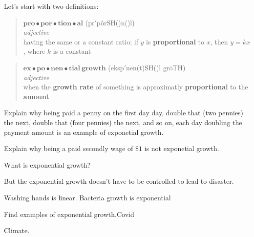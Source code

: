 \documentclass[nooutcomes,noauthor,hints]{ximera}
\begin{document}
\mynewpage



\begin{question}
  Let's start with two definitions:
  \begin{mdframed}[style=OutcomeStyle]
\begin{quote}
  $\textbf{pro}\bullet\textbf{por}\bullet\textbf{tion}\bullet\textbf{al}$
  (pr{}$'$p\^orSH({})n({})l)
  \\
  
  \textit{adjective}\\

  
\quad having the same or a constant ratio; if $y$ is \textbf{proportional} to
$x$, then $y = k x$, where $k$ is a constant
\end{quote}
  \end{mdframed}

  
  \begin{mdframed}[style=OutcomeStyle]
\begin{quote}
  $\textbf{ex}\bullet\textbf{po}\bullet\textbf{nen}\bullet\textbf{tial}~\textbf{growth}$
  ({}eksp{}$'$nen(t)SH({})l gr$\overline{\mbox{o}}$TH)
  \\
  
  \textit{adjective}\\

  
\quad when the \textbf{growth rate} of something is approximatly
\textbf{proportional} to the \textbf{amount}
\end{quote}
  \end{mdframed}
  \item Explain why being paid a penny on the first day day, double
    that (two pennies) the next, double that (four pennies) the next,
    and so on, each day doubling the payment amount is an example of
    exponetial growth.

  \item Explain why being a paid secondly wage of $\$1$ is not
    exponetial growth.


  What is exponential growth?

But the exponential growth doesn't have to be controlled to lead to disaster.


Washing hands is linear. Bacteria growth is exponential


\end{question}
\mynewpage


\begin{question}
  Find examples of exponential growth.Covid


Climate.


\end{question}
\end{document}
